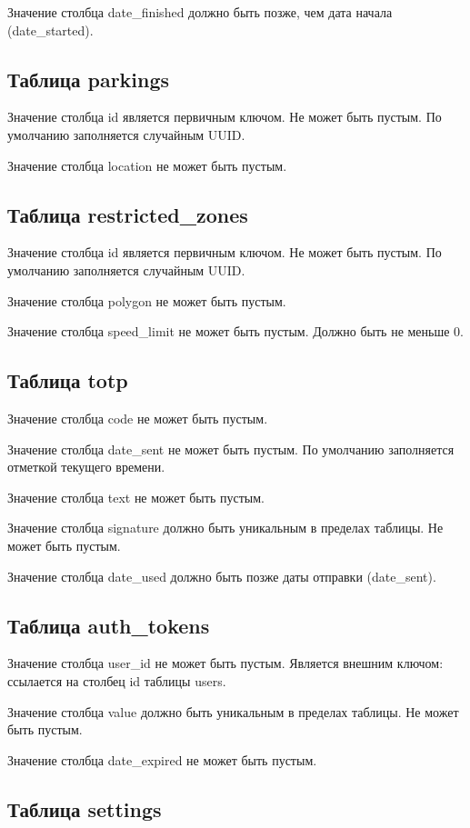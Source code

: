 Значение столбца date\_finished должно быть позже, чем дата начала (date\_started).

\subsection{Таблица parkings}

Значение столбца id является первичным ключом. Не может быть пустым. По умолчанию заполняется случайным UUID.

Значение столбца location не может быть пустым.

\subsection{Таблица restricted\_zones}

Значение столбца id является первичным ключом. Не может быть пустым. По умолчанию заполняется случайным UUID.

Значение столбца polygon не может быть пустым.

Значение столбца speed\_limit не может быть пустым. Должно быть не меньше 0.

\subsection{Таблица totp}

Значение столбца code не может быть пустым.

Значение столбца date\_sent не может быть пустым. По умолчанию заполняется отметкой текущего времени.

Значение столбца text не может быть пустым.

Значение столбца signature должно быть уникальным в пределах таблицы. Не может быть пустым.

Значение столбца date\_used должно быть позже даты отправки (date\_sent).

\subsection{Таблица auth\_tokens}

Значение столбца user\_id не может быть пустым. Является внешним ключом: ссылается на столбец id таблицы users.

Значение столбца value должно быть уникальным в пределах таблицы. Не может быть пустым.

Значение столбца date\_expired не может быть пустым.

\subsection{Таблица settings}

